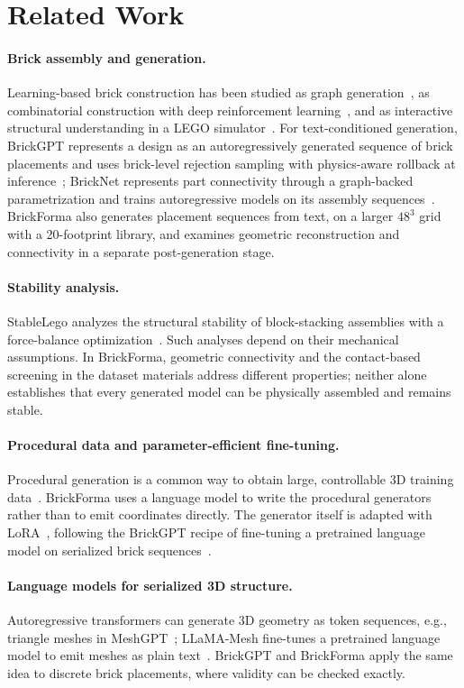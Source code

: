 \documentclass[letterpaper]{article} %
\begin{document}
\section{Related Work}
\paragraph{Brick assembly and generation.}
Learning-based brick construction has been studied as graph generation~\cite{thompson2020lego}, as combinatorial construction with deep reinforcement learning~\cite{brickbybrick}, and as interactive structural understanding in a LEGO simulator~\cite{breakandmake}. For text-conditioned generation, BrickGPT represents a design as an autoregressively generated sequence of brick placements and uses brick-level rejection sampling with physics-aware rollback at inference~\cite{brickgpt}; BrickNet represents part connectivity through a graph-backed parametrization and trains autoregressive models on its assembly sequences~\cite{bricknet}. BrickForma also generates placement sequences from text, on a larger $48^3$ grid with a 20-footprint library, and examines geometric reconstruction and connectivity in a separate post-generation stage.

\paragraph{Stability analysis.}
StableLego analyzes the structural stability of block-stacking assemblies with a force-balance optimization~\cite{stablelego}. Such analyses depend on their mechanical assumptions. In BrickForma, geometric connectivity and the contact-based screening in the dataset materials address different properties; neither alone establishes that every generated model can be physically assembled and remains stable.

\paragraph{Procedural data and parameter-efficient fine-tuning.}
Procedural generation is a common way to obtain large, controllable 3D training data~\cite{infinigen}. BrickForma uses a language model to write the procedural generators rather than to emit coordinates directly. The generator itself is adapted with LoRA~\cite{lora}, following the BrickGPT recipe of fine-tuning a pretrained language model on serialized brick sequences~\cite{brickgpt}.

\paragraph{Language models for serialized 3D structure.}
Autoregressive transformers can generate 3D geometry as token sequences, e.g., triangle meshes in MeshGPT~\cite{meshgpt}; LLaMA-Mesh fine-tunes a pretrained language model to emit meshes as plain text~\cite{llamamesh}. BrickGPT and BrickForma apply the same idea to discrete brick placements, where validity can be checked exactly.
\end{document}
